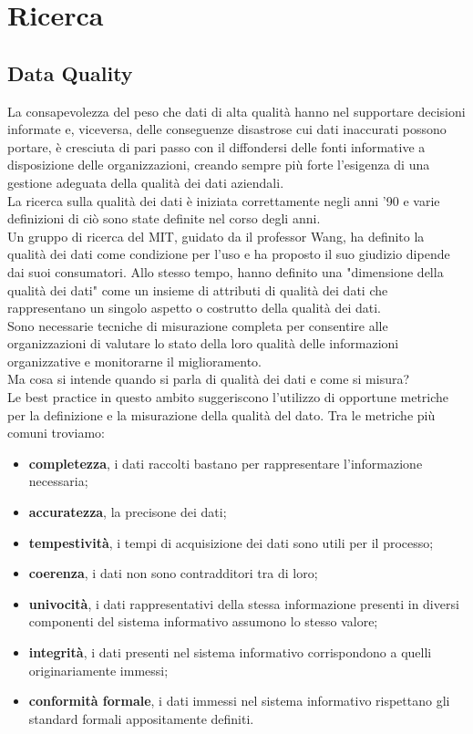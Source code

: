 \documentclass[a4paper,12pt]{article}
\begin{document}
\tableofcontents

\newpage

\section{Ricerca} 

\subsection{Data Quality}

La consapevolezza del peso che dati di alta qualità hanno nel supportare decisioni informate e, viceversa, delle conseguenze disastrose cui dati inaccurati possono portare, è cresciuta di pari passo con il diffondersi delle fonti informative a disposizione delle organizzazioni, creando sempre più forte l’esigenza di una gestione adeguata della qualità dei dati aziendali. \\
La ricerca sulla qualità dei dati è iniziata correttamente negli anni '90 e varie definizioni di ciò sono state definite nel corso degli anni. \\
Un gruppo di ricerca del MIT, guidato da il professor Wang, ha definito la qualità dei dati come condizione per l'uso e ha proposto il suo giudizio dipende dai suoi consumatori. Allo stesso tempo, hanno definito una "dimensione della qualità dei dati" come un insieme di attributi di qualità dei dati che rappresentano un singolo aspetto o costrutto della qualità dei dati. \\
Sono necessarie tecniche di misurazione completa per consentire alle organizzazioni di valutare lo stato della loro qualità delle informazioni organizzative e monitorarne il miglioramento. \\
Ma cosa si intende quando si parla di qualità dei dati e come si misura? \\
Le best practice in questo ambito suggeriscono l’utilizzo di opportune metriche per la definizione e la misurazione della qualità del dato.
Tra le metriche più comuni troviamo:

\begin{itemize}
\item \textbf{completezza}, i dati raccolti bastano per rappresentare l'informazione necessaria; 
\item \textbf{accuratezza}, la precisone dei dati;
\item \textbf{tempestività}, i tempi di acquisizione dei dati sono utili per il processo;
\item \textbf{coerenza}, i dati non sono contradditori tra di loro;
\item \textbf{univocità}, i dati rappresentativi della stessa informazione presenti in diversi componenti del sistema informativo assumono lo stesso valore;
\item \textbf{integrità}, i dati presenti nel sistema informativo corrispondono a quelli originariamente immessi;
\item \textbf{conformità formale}, i dati immessi nel sistema informativo rispettano gli standard formali appositamente definiti.
\end{itemize} 
\end{document}
